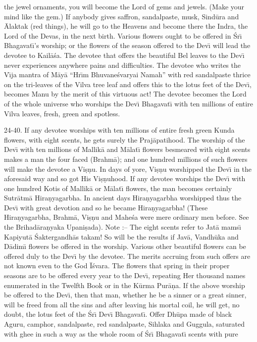 the jewel ornaments, you will become the Lord of gems and jewels. (Make your mind like the gem.) If anybody gives saffron, sandalpaste, musk, Sind\=ura and \=Alaktak (red things), he will go to the Heavens and become there the Indra, the Lord of the Devas, in the next birth. Various flowers ought to be offered in \'Sr\={\i} Bhagavat\={\i}'s worship; or the flowers of the season offered to the Dev\={\i} will lead the devotee to Kail\=a\'sa. The devotee that offers the beautiful Bel leaves to the Dev\={\i} never experiences anywhere pains and difficulties. The devotee who writes the V\={\i}ja mantra of M\=ay\=a ``Hr\={\i}m Bhuvane\'svaryai Namah'' with red sandalpaste thrice on the tri-leaves of the Vilva tree leaf and offers this to the lotus feet of the Dev\={\i}, becomes Manu by the merit of this virtuous act! The devotee becomes the Lord of the whole universe who worships the Dev\={\i} Bhagavat\={\i} with ten millions of entire Vilva leaves, fresh, green and spotless.

24-40. If any devotee worships with ten millions of entire fresh green Kunda flowers, with eight scents, he gets surely the Praj\=apatihood. The worship of the Dev\={\i} with ten millions of Mallik\=a and M\=alat\={\i} flowers besmeared with eight scents makes a man the four faced (Brahm\=a); and one hundred millions of such flowers will make the devotee a Vi\d{s}\d{n}u. In days of yore, Vi\d{s}\d{n}u worshipped the Dev\={\i} in the aforesaid way and so got His Vi\d{s}\d{n}uhood. If any devotee worships the Dev\={\i} with one hundred Kotis of Mallik\=a or M\=alat\={\i} flowers, the man becomes certainly Sutr\=atm\=a Hira\d{n}yagarbha. In ancient days Hira\d{n}yagarbha worshipped thus the Dev\={\i} with great devotion and so he became Hira\d{n}yagarbha! (These Hira\d{n}yagarbha, Brahm\=a, Vi\d{s}\d{n}u and Mahe\'sa were mere ordinary men before. See the Brihad\=ara\d{n}yaka Upani\d{s}ada). Note :-- The eight scents refer to Jat\=a mams\={\i} Kapiyut\=a \'Saktergandh\=as takam! So will be the results if Jav\=a, Vandh\=uka and D\=adim\={\i} flowers be offered in the worship. Various other beautiful flowers can be offered duly to the Dev\={\i} by the devotee. The merits accruing from such offers are not known even to the God \=I\'svara. The flowers that spring in their proper seasons are to be offered every year to the Dev\={\i}, repeating Her thousand names enumerated in the Twelfth Book or in the K\=urma Pur\=a\d{n}a. If the above worship be offered to the Dev\={\i}, then that man, whether he be a sinner or a great sinner, will be freed from all the sins and after leaving his mortal coil, he will get, no doubt, the lotus feet of the \'Sr\={\i} Dev\={\i} Bhagavat\={\i}. Offer Dh\=upa made of black Aguru, camphor, sandalpaste, red sandalpaste, Sihlaka and Guggula, saturated with ghee in such a way as the whole room of \'Sr\={\i} Bhagavat\={\i} scents with pure

